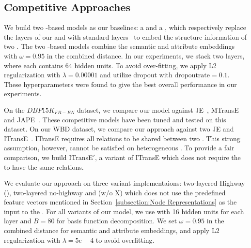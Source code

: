 	\subsection{Competitive Approaches}
	We build two \GCN-based models as our baselines: a \GCN and a \HGCN, which respectively replace the \RGCN layers of our \RGCN and \HRGCN with standard \GCN layers~\cite{Kipf2016Semi} to embed the structure information of two \KGs.
	The two \GCN-based models combine the semantic and attribute embeddings with $\omega=0.95$ in the combined distance.
	In our experiments, we stack two \GCN layers, where each \GCN contains 64 hidden units.
	To avoid over-fitting, we apply L2 regularization with $\lambda=0.00001$ and utilize dropout with $\mathrm{dropout rate}=0.1$.
	These hyperparameters were found to give the best overall performance in our experiments.



    On the $DBP15K_{FR-EN}$ dataset, we compare our \HRGCN model against JE~\cite{hao2016joint}, MTransE~\cite{chen2016multilingual} and JAPE~\cite{sun2017cross}.
    These competitive models have been tuned and tested on this dataset.
	On our WBD dataset, we compare our approach against two JE and ITransE~\cite{zhu2017iterative}. ITransE requires all relations to be
shared between two \KGs. This strong assumption, however, cannot be satisfied on heterogeneous \KGs. To provide a fair comparison, we build
ITransE$'$, a variant of ITransE which does not require the \KGs to have the same relations. 	


	
	 We evaluate our approach on three variant implementaions: two-layered Highway \RGCN (\HRGCN),
two-layered no-highway \RGCN and \HRGCN (w/o X) which does not use the predefined feature vectors mentioned in Section~\ref{subsection:Node
Representations} as the input to the \HRGCN. For all variants of our model, we use \RGCN with 16 hidden units for each layer and $B = 80$
for basis function decomposition. We set $\omega=0.95$ in the combined distance for semantic and attribute embeddings, and apply L2
regularization with $\lambda=5e-4$ to avoid overfitting.


